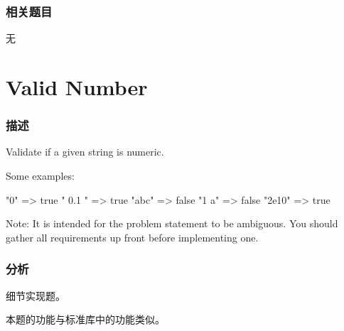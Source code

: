 \subsubsection{相关题目}
\begindot
\item 无
\myenddot


\section{Valid Number} %
\label{sec:valid-number}


\subsubsection{描述}
Validate if a given string is numeric.

Some examples:
\begin{Code}
"0" => true
" 0.1 " => true
"abc" => false
"1 a" => false
"2e10" => true
\end{Code}

Note: It is intended for the problem statement to be ambiguous. You should gather all requirements up front before implementing one.


\subsubsection{分析}
细节实现题。

本题的功能与标准库中的功能类似。


